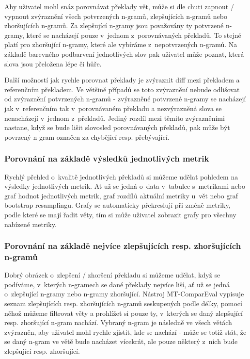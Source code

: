 Aby uživatel mohl snáz porovnávat překlady vět,
  může si dle chuti zapnout / vypnout zvýraznění všech potvrzených \mbox{n-gramů},
  zlepšujících \mbox{n-gramů} nebo zhoršujících \mbox{n-gramů}.
Za zlepšující \mbox{n-gramy} jsou považovány ty potvrzené \mbox{n-gramy},
  které se nacházejí pouze v~jednom z~porovnávaných překladů.
To stejné platí pro zhoršující \mbox{n-gramy},
  které ale vybíráme z~nepotvrzených \mbox{n-gramů}.
Na základě barevného podbarvení jednotlivých slov pak uživatel může poznat,
  která slova jsou přeložena lépe či hůře.

Další možností jak rychle porovnat překlady je zvýraznit diff mezi překladem a referenčním překladem.
Ve většině případů se toto zvýraznění nebude odlišovat od zvýraznění potvrzených \mbox{n-gramů} -
  zvýrazněné potvrzené \mbox{n-gramy} se nacházejí jak v~referenčním tak v~porovnávaném překladu
  a nezvýrazněná slova se nenacházejí v~jednom z~překladů.
Jediný rozdíl mezi těmito zvýrazněními nastane,
  když se bude lišit slovosled porovnávaných překladů,
  pak může být povrzený \mbox{n-gram} označen za chybějicí resp. přebývající.

\subsubsection{Porovnání na základě výsledků jednotlivých metrik}
Rychlý přehled o~kvalitě jednotlivých překladů si můžeme udělat pohledem na výsledky jednotlivých metrik.
Ať už se jedná o~data v~tabulce s~metrikami nebo graf hodnot jednotlivých metrik,
  graf rozdílů aktuální metriky u~vět nebo graf bootstrap resamplingu.
Grafy se automaticky překreslují při změně metriky,
  podle které se mají řadit věty,
  tím si může uživatel zobrazit grafy pro všechny nabízené metriky.


\subsubsection{Porovnání na základě nejvíce zlepšujících resp. zhoršujících \mbox{n-gramů}}
Dobrý obrázek o~zlepšení / zhoršení překladu si můžeme udělat,
  když se podíváme,
  v~kterých \mbox{n-gramech} se dané překlady nejvíce liší,
  ať už se jedná o~zlepšující \mbox{n-gramy} nebo \mbox{n-gramy} zhoršující.
Nástroj MT-ComparEval vypisuje seznam zlepšujících resp. zhoršujících \mbox{n-gramů} seskupených podle délky,
  pomocí něhož můžeme filtrovat věty a prohlížet si pouze ty,
  v~kterých se daný zlepšující resp. zhoršující \mbox{n-gram} nachází.
Vybraný \mbox{n-gram} je následně ve všech větách zvýrazněn,
  aby uživatel mohl rychle zjistit, kde se nachází -
  může se totiž stát, že se daný \mbox{n-gram} ve větě bude nacházet vícekrát,
  ale pouze některý z~nich bude zlepšující resp. zhoršující.


